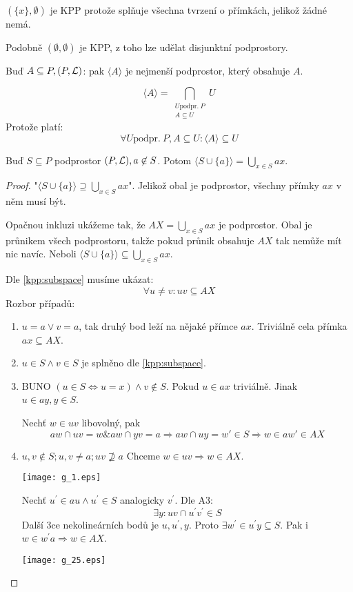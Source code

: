 \begin{observation}
	$(\{ x \}, \emptyset)$ je KPP protože splňuje všechna tvrzení o přímkách, jelikož žádné nemá.

	Podobně $( \emptyset, \emptyset)$ je KPP, z toho lze udělat disjunktní podprostory.
\end{observation}

\begin{definition}[Obal]
    Buď $A \subseteq P, (P, \operatorname{\mathcal{L}})$: pak $\langle A \rangle$ je nejmenší podprostor, který obsahuje $A$.

    \[ \langle A \rangle = \bigcap_{\substack{U \text{podpr.}\ P \\ A \subseteq U }} U \]
    Protože platí:
    \[ \forall U \text{podpr.}\ P, A \subseteq U: \langle A \rangle \subseteq U \]
\end{definition}

\begin{lemma}\label{kpp:point_add_sub}
    Buď $S \subseteq P$ podprostor $(P, \operatorname{\mathcal{L}}), a \not\in S$.
    Potom $\langle S \cup \{a\} \rangle = \bigcup_{x\in S}ax$.
\end{lemma}
\begin{proof}
	"$\langle S \cup \{a\} \rangle \supseteq \bigcup_{x\in S}ax$".
	Jelikož obal je podprostor, všechny přímky $ax$ v něm musí být.

	Opačnou inkluzi ukážeme tak, že $AX = \bigcup_{x\in S} ax$ je podprostor.
	Obal je průnikem všech podprostoru, takže pokud průnik obsahuje $AX$ tak nemůže mít nic navíc.
	Neboli $\langle S \cup \{a\} \rangle \subseteq \bigcup_{x\in S}ax$.

	Dle \cref{kpp:subspace} musíme ukázat:
	\[ \forall u \ne v: uv \subseteq AX \]
	Rozbor případů:
	\begin{enumerate}
		\item $u = a \lor v = a$, tak druhý bod leží na nějaké přímce $ax$.
			Triviálně cela přímka $ax \subseteq AX$.
		\item $u \in S \land v \in S$ je splněno dle \cref{kpp:subspace}.
		\item BUNO $(u \in S \iff u = x) \land v \not\in S$.
			Pokud $u \in ax$ triviálně.
			Jinak $u \in ay, y \in S$.

			Nechť $w \in uv$ libovolný, pak
			\[ aw \cap uv = w \& aw \cap yv = a \Rightarrow aw \cap uy = w' \in S \Rightarrow w \in aw' \in AX \]
		\item $u, v \notin S; u, v \ne a; uv \nsupseteq a$
			Chceme $w \in uv \Rightarrow w \in AX$.

		\texttt{[image: g\_1.eps]}

		Nechť $u^{\prime} \in au \land u^{\prime} \in S$ analogicky $v^{\prime}$.
		Dle A3:
		\[ \exists y: uv \cap u^{\prime}v^{\prime} \in S \]
		Další 3ce nekolineárních bodů je $u, u^{\prime}, y$.
		Proto $\exists w^{\prime} \in u^{\prime}y \subseteq S$.
		Pak i $w \in w^{\prime}a \Rightarrow w \in AX$.

		\texttt{[image: g\_25.eps]}
	\end{enumerate}
\end{proof}


